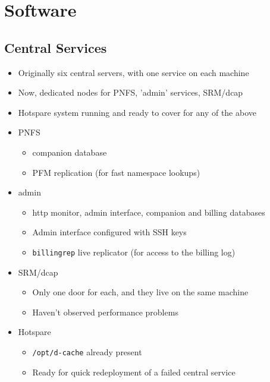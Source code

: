 \documentclass{beamer}
\begin{document}
\section{Software}
\subsection{Central Services}
\begin{frame}
\begin{itemize}
	\item Originally six central servers, with one service on each machine
	\item Now, dedicated nodes for PNFS, 'admin' services, SRM/dcap
	\item Hotspare system running and ready to cover for any of the above
	\item PNFS
	\begin{itemize}
		\item companion database
		\item PFM replication (for fast namespace lookups)
	\end{itemize}
	\item admin
	\begin{itemize}
		\item http monitor, admin interface, companion and billing databases
		\item Admin interface configured with SSH keys
		\item {\tt billingrep} live replicator (for access to the billing log)
	\end{itemize}
	\item SRM/dcap
	\begin{itemize}
		\item Only one door for each, and they live on the same machine
		\item Haven't observed performance problems
	\end{itemize}
	\item Hotspare
	\begin{itemize}
		\item {\tt /opt/d-cache} already present
		\item Ready for quick redeployment of a failed central service
	\end{itemize}
\end{itemize}
\end{frame}
\end{document}
